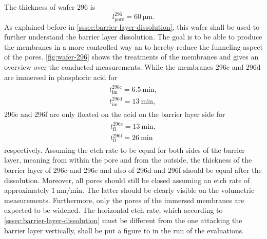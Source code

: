 \documentclass[thesis.tex]{subfiles}
\begin{document}
      The thickness of wafer 296 is
      \begin{equation}
          l^{296}_\mathrm{pore}=\SI{60}{\micro\meter}.
      \end{equation}
      As explained before in \cref{sssec:barrier-layer-dissolution}, this wafer shall be used to further understand the barrier layer dissolution. The goal is to be able to produce the membranes in a more controlled way an to hereby reduce the funneling aspect of the pores. \cref{fig:wafer-296} shows the treatments of the membranes and gives an overview over the conducted measurements. While the membranes 296c and 296d are immersed in phosphoric acid for
      \begin{align}
          \begin{split}
              t^\mathrm{296c}_\mathrm{im}=\SI{6,5}{\minute},    \\
              t^\mathrm{296d}_\mathrm{im}=\SI{13}{\minute},
          \end{split}
          \label{eq:t-immerse}
      \end{align}
      296e and 296f are only floated on the acid on the barrier layer side for
      \begin{align}
          \begin{split}
              t^\mathrm{296e}_\mathrm{fl}=\SI{13}{\minute}, \\
              t^\mathrm{296f}_\mathrm{fl}=\SI{26}{\minute}
          \end{split}
          \label{eq:t-float}
      \end{align}
      respectively. Assuming the etch rate to be equal for both sides of the barrier layer, meaning from within the pore and from the outside, the thickness of the barrier layer of 296c and 296e and also of 296d and 296f should be equal after the dissolution. Moreover, all pores should still be closed assuming an etch rate of approximately $\SI{1}{\nano\meter\per\minute}$. The latter should be clearly visible on the volumetric measurements. Furthermore, only the pores of the immersed membranes are expected to be widened. The horizontal etch rate, which according to \cref{sssec:barrier-layer-dissolution} must be different from the one attacking the barrier layer vertically, shall be put a figure to in the run of the evaluations.

      
\end{document}
